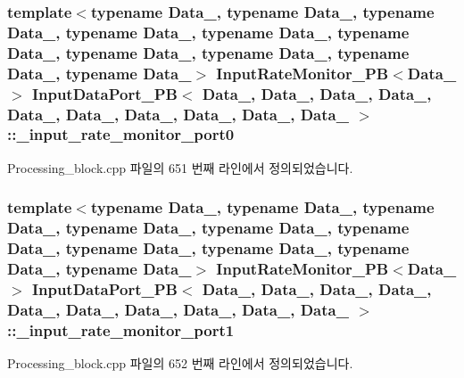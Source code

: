 \subsubsection[{\texorpdfstring{\+\_\+input\+\_\+rate\+\_\+monitor\+\_\+port0}{_input_rate_monitor_port0}}]{\setlength{\rightskip}{0pt plus 5cm}template$<$typename Data\+\_, typename Data\+\_, typename Data\+\_, typename Data\+\_, typename Data\+\_, typename Data\+\_, typename Data\+\_, typename Data\+\_, typename Data\+\_, typename Data\+\_$>$ {\bf Input\+Rate\+Monitor\+\_\+\+PB}$<$Data\+\_$>$ {\bf Input\+Data\+Port\+\_\+\+PB}$<$ Data\+\_, Data\+\_, Data\+\_, Data\+\_, Data\+\_, Data\+\_, Data\+\_, Data\+\_, Data\+\_, Data\+\_ $>$\+::\+\_\+input\+\_\+rate\+\_\+monitor\+\_\+port0\hspace{0.3cm}{\ttfamily [private]}}\hypertarget{classInputDataPort__PB_a652aab9b8981a0286167871600a11669}{}\label{classInputDataPort__PB_a652aab9b8981a0286167871600a11669}


Processing\+\_\+block.\+cpp 파일의 651 번째 라인에서 정의되었습니다.

\subsubsection[{\texorpdfstring{\+\_\+input\+\_\+rate\+\_\+monitor\+\_\+port1}{_input_rate_monitor_port1}}]{\setlength{\rightskip}{0pt plus 5cm}template$<$typename Data\+\_, typename Data\+\_, typename Data\+\_, typename Data\+\_, typename Data\+\_, typename Data\+\_, typename Data\+\_, typename Data\+\_, typename Data\+\_, typename Data\+\_$>$ {\bf Input\+Rate\+Monitor\+\_\+\+PB}$<$Data\+\_$>$ {\bf Input\+Data\+Port\+\_\+\+PB}$<$ Data\+\_, Data\+\_, Data\+\_, Data\+\_, Data\+\_, Data\+\_, Data\+\_, Data\+\_, Data\+\_, Data\+\_ $>$\+::\+\_\+input\+\_\+rate\+\_\+monitor\+\_\+port1\hspace{0.3cm}{\ttfamily [private]}}\hypertarget{classInputDataPort__PB_acd3a6668805ad1a581ab741faa3245f1}{}\label{classInputDataPort__PB_acd3a6668805ad1a581ab741faa3245f1}


Processing\+\_\+block.\+cpp 파일의 652 번째 라인에서 정의되었습니다.

